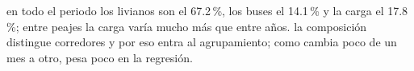 {en todo el periodo los livianos son el 67.2\,\%, los buses el 14.1\,\% y la carga el 17.8\,\%; entre peajes la carga varía mucho más que entre años.}
{la composición distingue corredores y por eso entra al agrupamiento; como cambia poco de un mes a otro, pesa poco en la regresión.}
